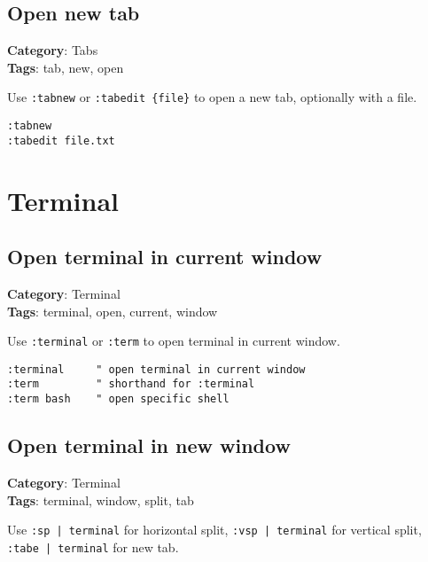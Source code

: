 {{{{{{{{{{{{{\section{Open new tab}

\textbf{Category}: Tabs\\ \textbf{Tags}: tab, new, open
\vspace{0.5cm}

Use {\footnotesize \Verb§:tabnew§} or {\footnotesize \Verb§:tabedit {file}§} to open a new tab, optionally with a file.

\begin{Exa*}{}
\begin{Verbatim}[fontsize=\footnotesize, breaklines, breakanywhere]
:tabnew
:tabedit file.txt
\end{Verbatim}
\end{Exa*}

\chapter{Terminal}
\section{Open terminal in current window}

\textbf{Category}: Terminal\\ \textbf{Tags}: terminal, open, current, window
\vspace{0.5cm}

Use {\footnotesize \Verb§:terminal§} or {\footnotesize \Verb§:term§} to open terminal in current window.

\begin{Exa*}{}
\begin{Verbatim}[fontsize=\footnotesize, breaklines, breakanywhere]
:terminal     " open terminal in current window
:term         " shorthand for :terminal
:term bash    " open specific shell
\end{Verbatim}
\end{Exa*}

\section{Open terminal in new window}

\textbf{Category}: Terminal\\ \textbf{Tags}: terminal, window, split, tab
\vspace{0.5cm}

Use {\footnotesize \Verb§:sp | terminal§} for horizontal split, {\footnotesize \Verb§:vsp | terminal§} for vertical split, {\footnotesize \Verb§:tabe | terminal§} for new tab.

}}}}}}}}}}}}}
